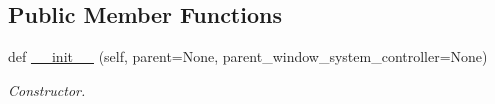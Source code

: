 \subsection*{Public Member Functions}
\begin{DoxyCompactItemize}
\item 
def \hyperlink{classplume-creator_1_1src_1_1plume_1_1gui_1_1note__panel_1_1_note_panel_a7daa6c090595524957b9449a7f5e67c5}{\+\_\+\+\_\+init\+\_\+\+\_\+} (self, parent=None, parent\+\_\+window\+\_\+system\+\_\+controller=None)\hypertarget{classplume-creator_1_1src_1_1plume_1_1gui_1_1note__panel_1_1_note_panel_a7daa6c090595524957b9449a7f5e67c5}{}\label{classplume-creator_1_1src_1_1plume_1_1gui_1_1note__panel_1_1_note_panel_a7daa6c090595524957b9449a7f5e67c5}

\begin{DoxyCompactList}\small\item\em Constructor. \end{DoxyCompactList}\end{DoxyCompactItemize}
